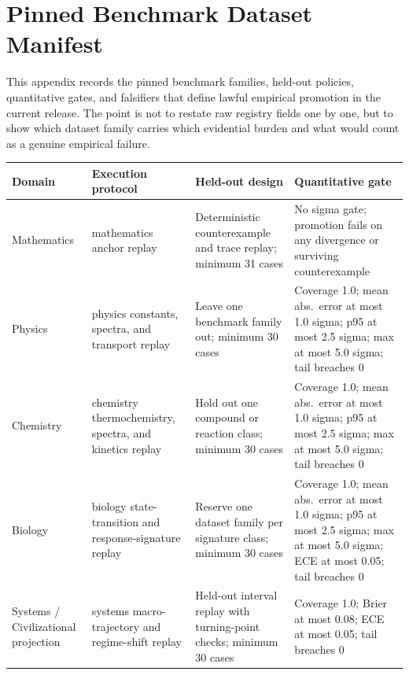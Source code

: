 \section{Pinned Benchmark Dataset Manifest}
\label{sec:oc-core-1-3-domain-benchmark-manifest}

This appendix records the pinned benchmark families, held-out policies,
quantitative gates, and falsifiers that define lawful empirical promotion in
the current release. The point is not to restate raw registry fields one by
one, but to show which dataset family carries which evidential burden and what
would count as a genuine empirical failure.

\begingroup
\footnotesize
\RaggedRight
\setlength{\tabcolsep}{4pt}
\setlength{\LTleft}{0pt}
\setlength{\LTright}{0pt}

\begin{table}[htbp]
\centering
\begin{tabular}{@{}L{0.16\textwidth}L{0.24\textwidth}L{0.27\textwidth}L{0.25\textwidth}@{}}
\toprule
Domain & Execution protocol & Held-out design & Quantitative gate \\
\midrule
Mathematics & mathematics anchor replay & Deterministic counterexample and trace replay; minimum 31 cases & No sigma gate; promotion fails on any divergence or surviving counterexample \\
Physics & physics constants, spectra, and transport replay & Leave one benchmark family out; minimum 30 cases & Coverage 1.0; mean abs.\ error at most 1.0 sigma; p95 at most 2.5 sigma; max at most 5.0 sigma; tail breaches 0 \\
Chemistry & chemistry thermochemistry, spectra, and kinetics replay & Hold out one compound or reaction class; minimum 30 cases & Coverage 1.0; mean abs.\ error at most 1.0 sigma; p95 at most 2.5 sigma; max at most 5.0 sigma; tail breaches 0 \\
Biology & biology state-transition and response-signature replay & Reserve one dataset family per signature class; minimum 30 cases & Coverage 1.0; mean abs.\ error at most 1.0 sigma; p95 at most 2.5 sigma; max at most 5.0 sigma; ECE at most 0.05; tail breaches 0 \\
Systems / Civilizational projection & systems macro-trajectory and regime-shift replay & Held-out interval replay with turning-point checks; minimum 30 cases & Coverage 1.0; Brier at most 0.08; ECE at most 0.05; tail breaches 0 \\
\bottomrule
\end{tabular}
\end{table}

